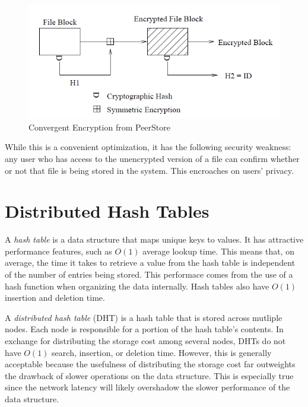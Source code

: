 \documentclass[12pt]{report}
\begin{document}
\begin{figure} \label{fig:convergent}
  \centering
  \includegraphics[scale=0.75]{ConvergentEncryption}
  \caption{Convergent Encryption from PeerStore}
\end{figure}

While this is a convenient optimization, it has the following security weakness: any user who has access to the unencrypted version of a file can confirm whether or not that file is being stored in the system. This encroaches on users' privacy.


\section{Distributed Hash Tables} \label{sec:backgroundDHT}

A \textit{hash table} is a data structure that maps unique keys to values. It has attractive performance features, such as $O(1)$ average lookup time. This means that, on average, the time it takes to retrieve a value from the hash table is independent of the number of entries being stored. This performace comes from the use of a hash function when organizing the data internally. Hash tables also have $O(1)$ insertion and deletion time.

A \textit{distributed hash table} (DHT) is a hash table that is stored across mutliple nodes. Each node is responsible for a portion of the hash table's contents. In exchange for distributing the storage cost among several nodes, DHTs do not have $O(1)$ search, insertion, or deletion time. However, this is generally acceptable because the usefulness of distributing the storage cost far outweights the drawback of slower operations on the data structure. This is especially true since the network latency will likely overshadow the slower performance of the data structure. 
\end{document}
